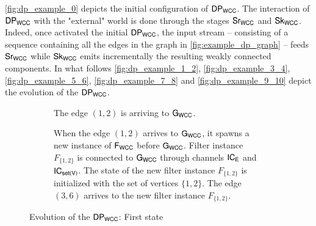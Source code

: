 \autoref{fig:dp_example_0} depicts the initial configuration of $\dpwcc$. 
The interaction of $\dpwcc$ with the "external" world is done through the stages $\mathsf{Sr_{WCC}}$ and $\mathsf{Sk_{WCC}}$. 
Indeed, once activated the initial $\dpwcc$, the input stream -- consisting of a sequence containing all the edges in the graph in \autoref{fig:example_dp_graph} -- feeds $\mathsf{Sr_{WCC}}$ while  $\mathsf{Sk_{WCC}}$ emits incrementally the resulting weakly connected components.  
In what follows \autoref{fig:dp_example_1_2}, \autoref{fig:dp_example_3_4}, \autoref{fig:dp_example_5_6}, \autoref{fig:dp_example_7_8} and \autoref{fig:dp_example_9_10} depict the evolution of the $\dpwcc$.
 
\begin{figure}[h!]
\centering
\begin{subfigure}[b]{\textwidth}
 \centering
  \caption{The edge $(1,2)$ is arriving to $\mathsf{G_{WCC}}$.}
  \label{fig:dp_example_1_2a}
\end{subfigure}
\vspace{.3cm}

\begin{subfigure}[b]{\textwidth}
 \centering
  \caption{When the edge $(1,2)$ arrives to $\mathsf{G_{WCC}}$, it  spawns a new instance of $\mathsf{F_{WCC}}$ before $\mathsf{G_{WCC}}$. Filter instance $F_{\{1,2\}}$ is connected to  $\mathsf{G_{WCC}}$ through channels $\mathsf{IC_E}$ and  $\mathsf{IC_{set(V)}}$. The state of the new filter instance $F_{\{1,2\}}$ is initialized with the set of vertices $\{1,2\}$. The edge $(3,6)$ arrives to the new filter instance $F_{\{1,2\}}$.}
  \label{fig:dp_example_1_2b}
\end{subfigure}
\caption[{[PoC] $\dpwcc$ Evolving first state}]{Evolution of the $\dpwcc$: First state}
\label{fig:dp_example_1_2}
\end{figure}
\vspace{.5cm}

